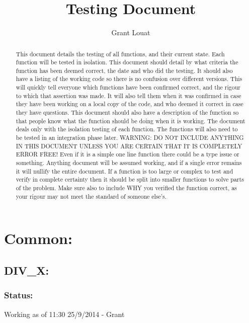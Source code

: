 \documentclass[]{article}
\title{Testing Document}
\author{Grant Louat}
\begin{document}
\maketitle

\begin{abstract}
This document details the testing of all functions, and their current state. Each function will be tested in isolation. This document should detail by what criteria the function has been deemed correct, the date and who did the testing. It should also have a listing of the working code so there is no confusion over different versions. This will quickly tell everyone which functions have been confirmed correct, and the rigour to which that assertion was made. It will also tell them when it was confirmed in case they have been working on a local copy of the code, and who deemed it correct in case they have questions. This document should also have a description of the function so that people know what the function should be doing when it is working.\newline
The document deals only with the isolation testing of each function. The functions will also need to be tested in an integration phase later. \newline
WARNING: DO NOT INCLUDE ANYTHING IN THIS DOCUMENT UNLESS YOU ARE CERTAIN THAT IT IS COMPLETELY ERROR FREE! \newline Even if it is a simple one line function there could be a type issue or something. Anything document will be assumed working, and if a single error remains it will nullify the entire document. If a function is too large or complex to test and verify in complete certainty then it should be split into smaller functions to solve parts of the problem. Make sure also to include WHY you verified the function correct, as your rigour may not meet the standard of someone else's.
\end{abstract}

\newpage
\section{Common:}

\subsection{DIV\_X:}
\subsubsection{Status:}
Working as of 11:30 25/9/2014 - Grant
\end{document}
